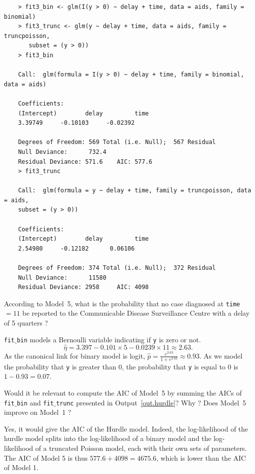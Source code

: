 \documentclass[11pt,a4paper%
addpoints, 
]{exam}
\begin{document}
\begin{questions}
\begin{center}
	\begin{verbatim}
	> fit3_bin <- glm(I(y > 0) ~ delay + time, data = aids, family = binomial)
	> fit3_trunc <- glm(y ~ delay + time, data = aids, family = truncpoisson, 
	   subset = (y > 0))
	> fit3_bin
	
	Call:  glm(formula = I(y > 0) ~ delay + time, family = binomial, data = aids)
	
	Coefficients:
	(Intercept)        delay         time  
	3.39749     -0.10103     -0.02392  
	
	Degrees of Freedom: 569 Total (i.e. Null);  567 Residual
	Null Deviance:	    732.4 
	Residual Deviance: 571.6 	AIC: 577.6
	> fit3_trunc
	
	Call:  glm(formula = y ~ delay + time, family = truncpoisson, data = aids, 
	subset = (y > 0))
	
	Coefficients:
	(Intercept)        delay         time  
	2.54980     -0.12182      0.06106  
	
	Degrees of Freedom: 374 Total (i.e. Null);  372 Residual
	Null Deviance:	    11580 
	Residual Deviance: 2958 	AIC: 4098
	\end{verbatim}
\end{center}
\question[2] According to Model~5, what is the probability that no case diagnosed at \texttt{time}$ = 11$ be reported to the Communicable Disease Surveillance Centre with a delay of 5 quarters ?
\begin{solution}
	\texttt{fit$\_$bin} models a Bernoulli variable indicating if \texttt{y} is zero or not. 
	$$\hat{\eta} = 3.397 - 0.101 \times 5 - 0.0239\times 11 \approx 2.63 .$$
	As the canonical link for binary model is logit, $\hat{p} = \frac{e^{2.63}}{1 + e^{2.63}} \approx 0.93$. As we model the probability that \texttt{y} is greater than $0$, the probability that \texttt{y} is equal to $0$ is $1 - 0.93 = 0.07$.	
\end{solution}
\question[2] Would it be relevant to compute the AIC of Model~5 by summing the AICs of \texttt{fit$\_$bin} and \texttt{fit$\_$trunc} presented in Output~\ref{out.hurdle}? Why ? Does Model~5 improve on Model~1 ?
\begin{solution}
	Yes, it would give the AIC of the Hurdle model. Indeed, the log-likelihood of the hurdle model splits into the log-likelihood of a binary model and the log-likelihood of a truncated Poisson model, each with their own sets of parameters.
	The AIC of Model 5 is thus $577.6 + 4098 = 4675.6$, which is lower than the AIC of Model 1.
\end{solution}



\end{questions}
\end{document}
